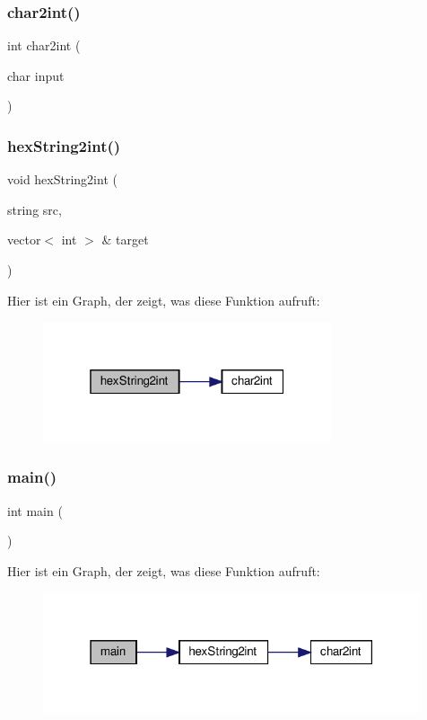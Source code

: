 \subsubsection{char2int()}
{\footnotesize\ttfamily int char2int (\begin{DoxyParamCaption}\item[{char}]{input }\end{DoxyParamCaption})}

\mbox{\label{formate-dump_8cpp_aeae18ebdde4bce2e14c349a623f286f7}} 
\subsubsection{hex\+String2int()}
{\footnotesize\ttfamily void hex\+String2int (\begin{DoxyParamCaption}\item[{string}]{src,  }\item[{vector$<$ int $>$ \&}]{target }\end{DoxyParamCaption})}

Hier ist ein Graph, der zeigt, was diese Funktion aufruft\+:
\nopagebreak
\begin{figure}[H]
\begin{center}
\leavevmode
\includegraphics[width=241pt]{formate-dump_8cpp_aeae18ebdde4bce2e14c349a623f286f7_cgraph}
\end{center}
\end{figure}
\mbox{\label{formate-dump_8cpp_ae66f6b31b5ad750f1fe042a706a4e3d4}} 
\subsubsection{main()}
{\footnotesize\ttfamily int main (\begin{DoxyParamCaption}{ }\end{DoxyParamCaption})}

Hier ist ein Graph, der zeigt, was diese Funktion aufruft\+:
\nopagebreak
\begin{figure}[H]
\begin{center}
\leavevmode
\includegraphics[width=315pt]{formate-dump_8cpp_ae66f6b31b5ad750f1fe042a706a4e3d4_cgraph}
\end{center}
\end{figure}
